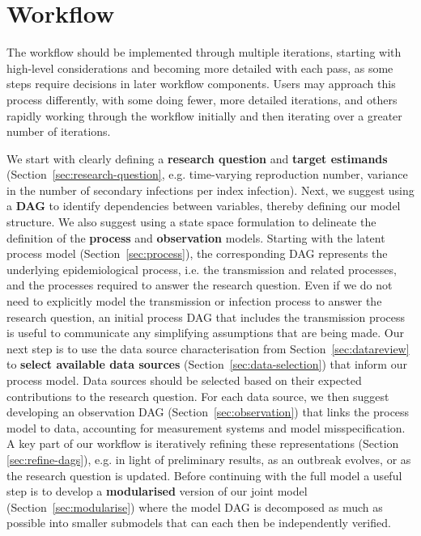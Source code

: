 \documentclass{article}
\begin{document}
\section{Workflow}
\label{sec:workflow}

The workflow should be implemented through multiple iterations, starting with high-level considerations and becoming more detailed with each pass, as some steps require decisions in later workflow components. Users may approach this process differently, with some doing fewer, more detailed iterations, and others rapidly working through the workflow initially and then iterating over a greater number of iterations.

We start with clearly defining a \textbf{research question} and \textbf{target estimands} (Section~\ref{sec:research-question}, e.g. time-varying reproduction number, variance in the number of secondary infections per index infection). Next, we suggest using a \textbf{\ac{DAG}} to identify dependencies between variables, thereby defining our model structure. We also suggest using a state space formulation \citep{corbella2019statistical} to delineate the definition of the \textbf{process} and \textbf{observation} models. Starting with the latent process model (Section~\ref{sec:process}), the corresponding \ac{DAG} represents the underlying epidemiological process, i.e. the transmission and related processes, and the processes required to answer the research question. Even if we do not need to explicitly model the transmission or infection process to answer the research question, an initial process \ac{DAG} that includes the transmission process is useful to communicate any simplifying assumptions that are being made.
Our next step is to use the data source characterisation from Section~\ref{sec:datareview} to \textbf{select available data sources} (Section~\ref{sec:data-selection}) that inform our process model. Data sources should be selected based on their expected contributions to the research question. For each data source, we then suggest developing an observation \ac{DAG} (Section~\ref{sec:observation}) that links the process model to data, accounting for measurement systems and model misspecification. A key part of our workflow is iteratively refining these representations (Section \ref{sec:refine-dags}), e.g. in light of preliminary results, as an outbreak evolves, or as the research question is updated.
Before continuing with the full model a useful step is to develop a \textbf{modularised} version of our joint model (Section~\ref{sec:modularise}) where the model \ac{DAG} is decomposed as much as possible into smaller submodels that can each then be independently verified.
\end{document}

